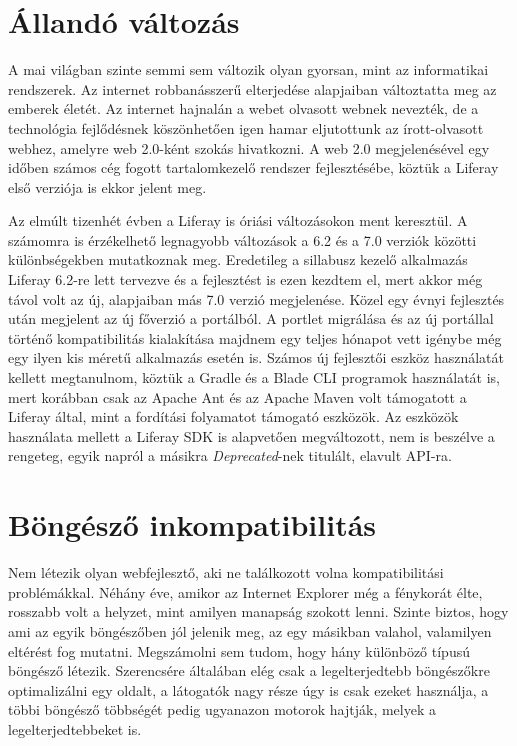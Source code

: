 \documentclass[hidelinks, 12pt, a4paper]{report}
\begin{document}
\section{Állandó változás}

A mai világban szinte semmi sem változik olyan gyorsan, mint az informatikai rendszerek. Az internet robbanásszerű elterjedése alapjaiban változtatta meg az emberek életét. Az internet hajnalán a webet olvasott webnek nevezték, de a technológia fejlődésnek köszönhetően igen hamar eljutottunk az írott-olvasott webhez, amelyre web 2.0-ként szokás hivatkozni. A web 2.0 megjelenésével egy időben számos cég fogott tartalomkezelő rendszer fejlesztésébe, köztük a Liferay első verziója is ekkor jelent meg.

Az elmúlt tizenhét évben a Liferay is óriási változásokon ment keresztül. A számomra is érzékelhető legnagyobb változások a 6.2 és a 7.0 verziók közötti különbségekben mutatkoznak meg. Eredetileg a sillabusz kezelő alkalmazás Liferay 6.2-re lett tervezve és a fejlesztést is ezen kezdtem el, mert akkor még távol volt az új, alapjaiban más 7.0 verzió megjelenése. Közel egy évnyi fejlesztés után megjelent az új főverzió a portálból. A portlet migrálása és az új portállal történő kompatibilitás kialakítása majdnem egy teljes hónapot vett igénybe még egy ilyen kis méretű alkalmazás esetén is. Számos új fejlesztői eszköz használatát kellett megtanulnom, köztük a Gradle \cite{gradle} és a Blade CLI \cite{blade-cli} programok használatát is, mert korábban csak az Apache Ant \cite{apache-ant} és az Apache Maven \cite{apache-maven} volt támogatott a Liferay által, mint a fordítási folyamatot támogató eszközök. Az eszközök használata mellett a Liferay SDK is alapvetően megváltozott, nem is beszélve a rengeteg, egyik napról a másikra \emph{Deprecated}-nek titulált, elavult API-ra.


\section{Böngésző inkompatibilitás}

Nem létezik olyan webfejlesztő, aki ne találkozott volna kompatibilitási problémákkal. Néhány éve, amikor az Internet Explorer még a fénykorát élte, rosszabb volt a helyzet, mint amilyen manapság szokott lenni. Szinte biztos, hogy ami az egyik böngészőben jól jelenik meg, az egy másikban valahol, valamilyen eltérést fog mutatni. Megszámolni sem tudom, hogy hány különböző típusú böngésző létezik. Szerencsére általában elég csak a legelterjedtebb böngészőkre optimalizálni egy oldalt, a látogatók nagy része úgy is csak ezeket használja, a többi böngésző többségét pedig ugyanazon motorok hajtják, melyek a legelterjedtebbeket is.
\end{document}

